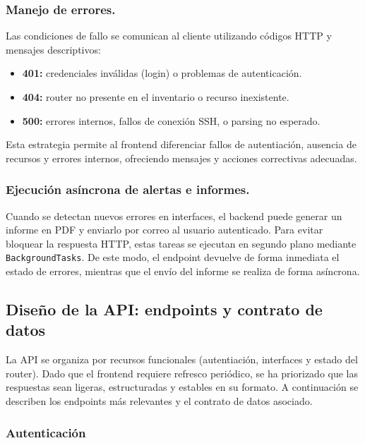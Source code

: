 \subsubsection*{Manejo de errores.}
\vspace*{0.5cm}

Las condiciones de fallo se comunican al cliente utilizando códigos HTTP y mensajes descriptivos:
\begin{itemize}
    \item \textbf{401:} credenciales inválidas (login) o problemas de autenticación.
    \item \textbf{404:} router no presente en el inventario o recurso inexistente.
    \item \textbf{500:} errores internos, fallos de conexión SSH, o parsing no esperado.
\end{itemize}

Esta estrategia permite al frontend diferenciar fallos de autentiación, ausencia de recursos y errores internos, ofreciendo mensajes y acciones correctivas adecuadas.

\subsubsection*{Ejecución asíncrona de alertas e informes.}
\vspace*{0.5cm}

Cuando se detectan nuevos errores en interfaces, el backend puede generar un informe en PDF y enviarlo por correo al usuario autenticado. Para evitar bloquear la respuesta HTTP, estas tareas se ejecutan en segundo plano mediante \texttt{BackgroundTasks}. De este modo, el endpoint devuelve de forma inmediata el estado de errores, mientras que el envío del informe se realiza de forma asíncrona.

\subsection*{Diseño de la API: endpoints y contrato de datos}

La API se organiza por recursos funcionales (autentiación, interfaces y estado del router). Dado que el frontend requiere refresco periódico, se ha priorizado que las respuestas sean ligeras, estructuradas y estables en su formato. A continuación se describen los endpoints más relevantes y el contrato de datos asociado.

\subsubsection*{Autenticación}

